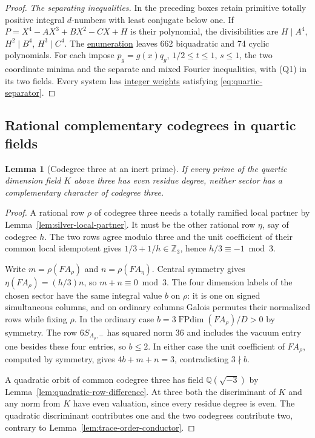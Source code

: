 \documentclass[11pt,reqno]{amsart}
\newcommand{\codecheck}[2]{\href{https://github.com/sebastienpalcoux/grothendieck-ring-classification/blob/d5750105bb5758f3ad38d2e5464dfcc12c019816/supplements/rank6/sphericality/#1}{#2}}
\newtheorem{lemma}[theorem]{Lemma}
\theoremstyle{remark}\newtheorem{remark}[theorem]{Remark}
\numberwithin{equation}{section}
\begin{document}
\begin{proof}
\smallskip\noindent\emph{The separating inequalities.} In the preceding boxes retain primitive totally positive integral
$d$-numbers with least conjugate below one. If
$P=X^4-AX^3+BX^2-CX+H$ is their polynomial, the divisibilities are
$H\mid A^4$, $H^2\mid B^4$, $H^3\mid C^4$. The
\codecheck{verify_quartic_silver_fields.py}{enumeration} leaves
662 biquadratic and 74 cyclic polynomials. For each impose
$p_g=g(x)q_g$, $1/2\le t\le1$, $s\le1$, the two coordinate minima
and the separate and mixed Fourier inequalities, with (Q1) in its two
fields. Every system has \codecheck{quartic_silver_field_weights.json}{integer
weights} satisfying \eqref{eq:quartic-separator}.
\end{proof}

\subsection{Rational complementary codegrees in quartic fields}

\begin{lemma}[Codegree three at an inert prime]\label{lem:quartic-three-induction}
If every prime of the quartic dimension field $K$ above three has
even residue degree, neither sector has a complementary character
of codegree three.
\end{lemma}
\begin{proof}
A rational row $\rho$ of codegree three needs a totally ramified
local partner by Lemma~\ref{lem:silver-local-partner}. It must be the
other rational row $\eta$, say of codegree $h$. The two rows agree
modulo three and the unit coefficient of their common local
idempotent gives $1/3+1/h\in\mathbb Z_3$, hence $h/3\equiv-1\bmod3$.

Write $m=\rho(FA_\rho)$ and $n=\rho(FA_\eta)$.
Central symmetry gives $\eta(FA_\rho)=(h/3)n$, so $m+n\equiv0\bmod3$.
The four dimension labels of the chosen sector have the same integral
value $b$ on $\rho$: it is one on signed simultaneous columns, and
on ordinary columns Galois permutes their normalized rows while
fixing $\rho$. In the ordinary case
$b=3\operatorname{FPdim}(FA_\rho)/D>0$ by symmetry. The row
$6S_{A_\rho,-}$ has squared norm $36$ and includes the vacuum entry
one besides these four entries, so $b\le2$. In either case
the unit coefficient of $FA_\rho$, computed by symmetry, gives
$4b+m+n=3$, contradicting $3\nmid b$.

A quadratic orbit of common codegree three has field
$\mathbb Q(\sqrt{-3})$ by Lemma~\ref{lem:quadratic-row-difference}.
At three both the discriminant of $K$ and any norm from $K$
have even valuation, since every residue degree is even.
The quadratic discriminant contributes one and the two codegrees
contribute two, contrary to Lemma~\ref{lem:trace-order-conductor}.
\end{proof}
\end{document}
